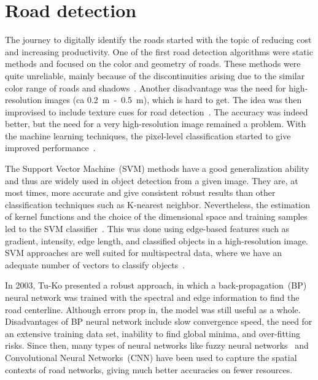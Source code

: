\section{Road detection}\label{sec:roadDetection}
The journey to digitally identify the roads started with the topic of reducing cost and increasing productivity. One of the first road detection algorithms were static methods and focused on the color and geometry of roads. These methods were quite unreliable, mainly because of the discontinuities arising due to the similar color range of roads and shadows~\cite{Detecting_interections_using_color,Detecting_roads_using_color}. Another disadvantage was the need for high-resolution images (ca 0.2~m~-~0.5~m), which is hard to get. The idea was then improvised to include texture cues for road detection~\cite{using_texture_for_road_detection,baumgartner1999automatic}. The accuracy was indeed better, but the need for a very high-resolution image remained a problem. With the machine learning techniques, the pixel-level classification started to give improved performance~\cite{road_detection_using_neural_nets_SVM,road_detection_using_env_learning,road_detection_using_SVM_online_learning}.

The Support Vector Machine~(SVM) methods have a good generalization ability and thus are widely used in object detection from a given image. They are, at most times, more accurate and give consistent robust results than other classification techniques such as K-nearest neighbor. Nevertheless, the estimation of kernel functions and the choice of the dimensional space and training samples led to the SVM classifier~\cite{YagerSowmya2003,melgani2004classification}. This was done using edge-based features such as gradient, intensity, edge length, and classified objects in a high-resolution image. SVM approaches are well suited for multispectral data, where we have an adequate number of vectors to classify objects~\cite{Simler2011}.

In 2003, Tu-Ko presented a robust approach, in which a back-propagation~(BP) neural network was trained with the spectral and edge information to find the road centerline. Although errors prop in, the model was still useful as a whole. Disadvantages of BP neural network include slow convergence speed, the need for an extensive training data set, inability to find global minima, and over-fitting risks. Since then, many types of neural networks like fuzzy neural networks~\cite{mokhtarzade2008automatic} and Convolutional Neural Networks~(CNN) have been used to capture the spatial contexts of road networks, giving much better accuracies on fewer resources.

